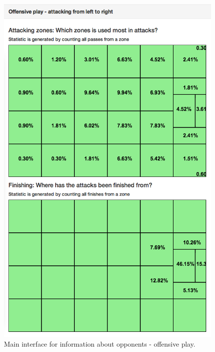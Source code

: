 \begin{figure}[H]
\centering
\includegraphics[width=1\textwidth]{images/general/team_analysis2.png}
\caption{Main interface for information about opponents - offensive play.}
\label{fig:team_analysis2}
\end{figure}


